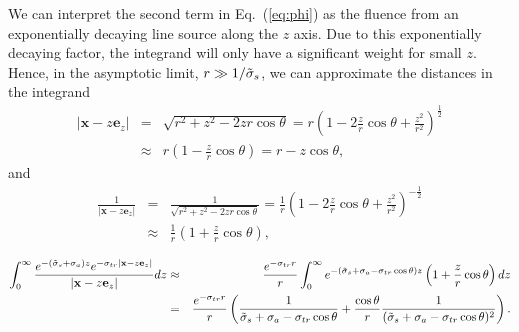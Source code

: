 \documentclass[10pt,a4paper]{article}
\begin{document}
We can interpret the second term in Eq.~(\ref{eq:phi}) as the fluence from
an exponentially decaying line source along the $z$ axis.
Due to this exponentially decaying factor, the integrand
will only have a significant weight for small $z$.
Hence, in the asymptotic limit, $r \gg 1/\tilde{\sigma}_s$, we can approximate
the distances in the integrand
\begin{eqnarray*}
    |\mathbf{x} - z \mathbf{e}_z| &=& \sqrt{r^2 + z^2 - 2 z r \cos
    \theta} = r \left(1 - 2 \frac{z}{r} \cos \theta + \frac{z^2}{r^2}
    \right)^\frac{1}{2} \\
    &\approx& r \left( 1 -  \frac{z}{r} \cos \theta \right) = r - z \cos
    \theta,
\end{eqnarray*}
and
\begin{eqnarray*}
    \frac{1}{|\mathbf{x} - z \mathbf{e}_z|} &=& \frac{1}{\sqrt{r^2 + z^2 - 2 z r \cos
    \theta}} = \frac{1}{r} \left(1 - 2 \frac{z}{r} \cos \theta + \frac{z^2}{r^2}
    \right)^{-\frac{1}{2}} \\
    &\approx& \frac{1}{r} \left( 1 +  \frac{z}{r} \cos \theta \right),
\end{eqnarray*}


\begin{eqnarray*}
     \int_0^\infty\frac{e^{-(\tilde{\sigma}_s + \sigma_a)z} e^{-\sigma_{tr}|\mathbf{x}
    - z \mathbf{e}_z| }}{|\mathbf{x} - z \mathbf{e}_z|}   d z & \approx &
    \frac{e^{-\sigma_{tr} r}}{r}  \int_0^\infty 
    e^{-(\tilde{\sigma}_s + \sigma_a - \sigma_{tr} \cos \theta )z}\left(1 + \frac{z}{r}
    \cos \theta \right)d z  \\
    &=& \frac{e^{-\sigma_{tr} r}}{r} \left( \frac{1}{\tilde{\sigma}_s + \sigma_a - \sigma_{tr}
    \cos \theta } + \frac{\cos \theta}{r} \frac{1}{(\tilde{\sigma}_s + \sigma_a - \sigma_{tr} \cos \theta)^2}
    \right).
\end{eqnarray*}
\end{document}
